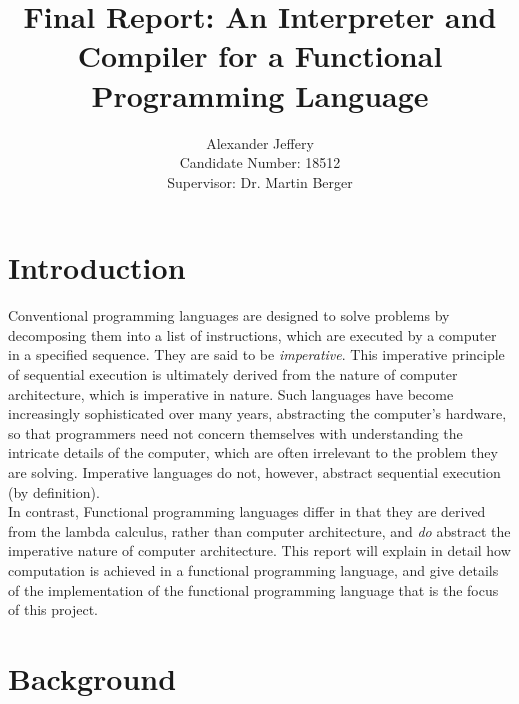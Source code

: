 \documentclass{article}
\title{\textbf{Final Report}: An Interpreter and Compiler for a Functional Programming Language}
\author{Alexander Jeffery\\
Candidate Number: 18512\\
Supervisor: Dr. Martin Berger}
\begin{document}
\maketitle

\section{Introduction}

Conventional programming languages are designed to solve problems by decomposing them into a list of instructions, which are executed by a computer in a specified sequence. They are said to be \emph{imperative}. This imperative principle of sequential execution is ultimately derived from the nature of computer architecture, which is imperative in nature. Such languages have become increasingly sophisticated over many years, abstracting the computer's hardware, so that programmers need not concern themselves with understanding the intricate details of the computer, which are often irrelevant to the problem they are solving. Imperative languages do not, however, abstract sequential execution (by definition).
\\
\indent In contrast, Functional programming languages differ in that they are derived from the lambda calculus, rather than computer architecture, and \emph{do} abstract the imperative nature of computer architecture. This report will explain in detail how computation is achieved in a functional programming language, and give details of the implementation of the functional programming language that is the focus of this project.

\pagebreak
\section{Background}
\end{document}
